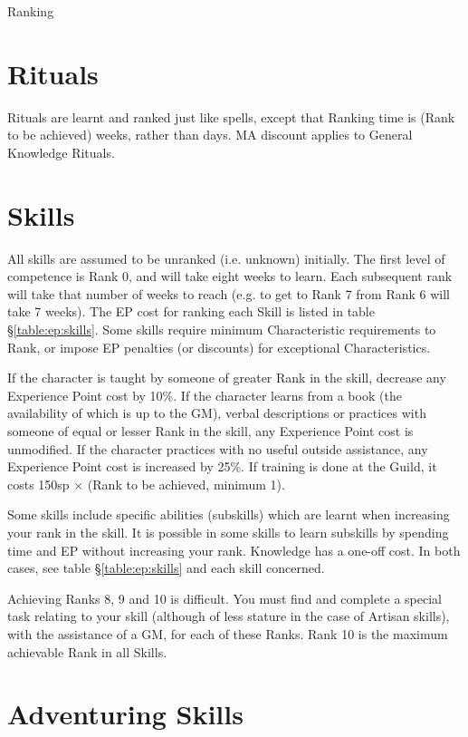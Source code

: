 \begin{Chapter}{Ranking}
\section{Rituals}

Rituals are learnt and ranked just like spells, except that Ranking
time is (Rank to be achieved) weeks, rather than days.  MA discount
applies to General Knowledge Rituals.

\section{Skills}

All skills are assumed to be unranked (i.e. unknown) initially.  The
first level of competence is Rank 0, and will take eight weeks to
learn.  Each subsequent rank will take that number of weeks to reach
(e.g. to get to Rank 7 from Rank 6 will take 7 weeks).  The EP cost
for ranking each Skill is listed in table \S\ref{table:ep:skills}.
Some skills require minimum Characteristic requirements to Rank, or
impose EP penalties (or discounts) for exceptional Characteristics.

If the character is taught by someone of greater Rank in the skill,
decrease any Experience Point cost by 10\%.  If the character learns
from a book (the availability of which is up to the GM), verbal
descriptions or practices with someone of equal or lesser Rank in the
skill, any Experience Point cost is unmodified.  If the character
practices with no useful outside assistance, any Experience Point cost
is increased by 25\%. If training is done at the Guild, it costs 150sp
× (Rank to be achieved, minimum 1).

Some skills include specific abilities (subskills) which are learnt
when increasing your rank in the skill. It is possible in some skills
to learn subskills by spending time and EP without increasing your
rank. Knowledge has a one-off cost. In both cases, see table
\S\ref{table:ep:skills} and each skill concerned.

Achieving Ranks 8, 9 and 10 is difficult. You must find and complete a
special task relating to your skill (although of less stature in the
case of Artisan skills), with the assistance of a GM, for each of
these Ranks.  Rank 10 is the maximum achievable Rank in all Skills.

\section{Adventuring Skills}


\end{Chapter}
